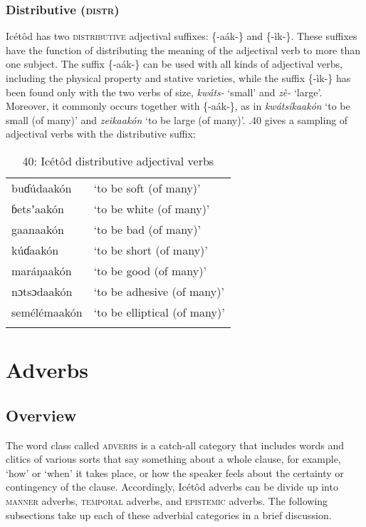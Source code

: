 \subsubsection{Distributive (\textsc{distr})}

Icétôd has two \textsc{distributive} adjectival suffixes: \{-aák-\} and \{-ìk-\}. These suffixes have the function of distributing the meaning of the adjectival verb to more than one subject. The suffix \{-aák-\} can be used with all kinds of adjectival verbs, including the physical property and stative varieties, while the suffix \{-ìk-\} has been found only with the two verbs of size, \textit{kwáts-} ‘small’ and \textit{zè-} ‘large’. Moreover, it commonly occurs together with \{-aák-\}, as in \textit{kwátsíkaakón} ‘to be small (of many)’ and \textit{zeikaakón} ‘to be large (of many)’. .40 gives a sampling of adjectival verbs with the distributive suffix:


\begin{table}
\caption{40: Icétôd distributive adjectival verbs}
\label{tab:8}


\begin{tabularx}{\textwidth}{XX}
\lsptoprule

buɗúdaakón & ‘to be soft (of many)’\\
ɓetsʼaakón & ‘to be white (of many)’\\
gaanaakón & ‘to be bad (of many)’\\
kúɗaakón & ‘to be short (of many)’\\
maráŋaakón & ‘to be good (of many)’\\
nɔtsɔdaakón & ‘to be adhesive (of many)’\\
semélémaakón & ‘to be elliptical (of many)’\\
\lspbottomrule
\end{tabularx}
\end{table}

\section{Adverbs}



\subsection{Overview}


The word class called \textsc{adverbs} is a catch-all category that includes words and clitics of various sorts that say something about a whole clause, for example, ‘how’ or ‘when’ it takes place, or how the speaker feels about the certainty or contingency of the clause. Accordingly, Icétôd adverbs can be divide up into \textsc{manner} adverbs, \textsc{temporal} adverbs, and \textsc{epistemic} adverbs. The following subsections take up each of these adverbial categories in a brief discussion.




